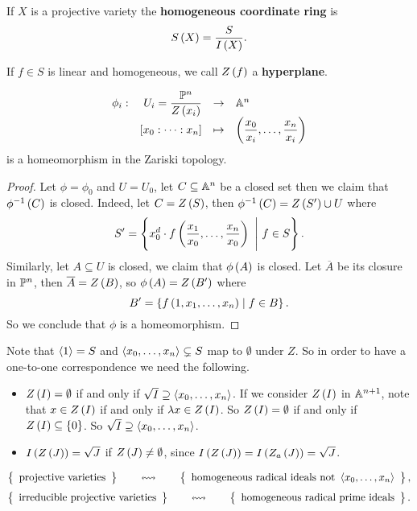 \begin{definition}
If $ X $ is a projective variety the \textbf{homogeneous coordinate ring} is
$$ S\rb{X} = \dfrac{S}{I\rb{X}}. $$
\end{definition}

\begin{definition}
If $ f \in S $ is linear and homogeneous, we call $ Z\rb{f} $ a \textbf{hyperplane}.
\end{definition}


\begin{proposition}
$$ \function[\phi_i]{U_i = \dfrac{\P^n}{Z\rb{x_i}}}{\A^n}{\sb{x_0 : \dots : x_n}}{\rb{\dfrac{x_0}{x_i}, \dots, \dfrac{x_n}{x_i}}} $$
is a homeomorphism in the Zariski topology.
\end{proposition}

\begin{proof}
Let $ \phi = \phi_0 $ and $ U = U_0 $, let $ C \subseteq \A^n $ be a closed set then we claim that $ \phi^{-1}\rb{C} $ is closed. Indeed, let $ C = Z\rb{S} $, then $ \phi^{-1}\rb{C} = Z\rb{S'} \cup U $ where
$$ S' = \cb{x_0^d \cdot f\rb{\dfrac{x_1}{x_0}, \dots, \dfrac{x_n}{x_0}} \ \Bigg| \ f \in S}. $$
Similarly, let $ A \subseteq U $ is closed, we claim that $ \phi\rb{A} $ is closed. Let $ \overline{A} $ be its closure in $ \P^n $, then $ \overline{A} = Z\rb{B} $, so $ \phi\rb{A} = Z\rb{B'} $ where
$$ B' = \cb{f\rb{1, x_1, \dots, x_n} \mid f \in B}. $$
So we conclude that $ \phi $ is a homeomorphism.
\end{proof}

Note that $ \ab{1} = S $ and $ \ab{x_0, \dots, x_n} \subsetneq S $ map to $ \emptyset $ under $ Z $. So in order to have a one-to-one correspondence we need the following.
\begin{itemize}
\item $ Z\rb{I} = \emptyset $ if and only if $ \sqrt{I} \supseteq \ab{x_0, \dots, x_n} $. If we consider $ Z\rb{I} $ in $ \A^{n + 1} $, note that $ x \in Z\rb{I} $ if and only if $ \lambda x \in Z\rb{I} $. So $ Z\rb{I} = \emptyset $ if and only if $ Z\rb{I} \subseteq \cb{0} $. So $ \sqrt{I} \supseteq \ab{x_0, \dots, x_n} $.
\item $ I\rb{Z\rb{J}} = \sqrt{J} $ if $ Z\rb{J} \ne \emptyset $, since $ I\rb{Z\rb{J}} = I\rb{Z_a\rb{J}} = \sqrt{J} $.
\end{itemize}

\begin{corollary}
$$ \correspondence{\text{projective varieties}}{\text{homogeneous radical ideals not} \ \ab{x_0, \dots, x_n}}, $$
$$ \correspondence{\text{irreducible projective varieties}}{\text{homogeneous radical prime ideals}}. $$
\end{corollary}

